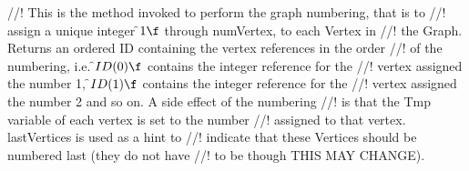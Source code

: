 //! This is the method invoked to perform the graph numbering, that is to
//! assign a unique integer \f$1\f$ through \p numVertex, to each Vertex in
//! the Graph. Returns an ordered ID containing the vertex references in the order
//! of the numbering, i.e. \f$ID(0)\f$ contains the integer reference for the
//! vertex assigned the number 1, \f$ID(1)\f$ contains the integer reference for the
//! vertex assigned the number 2 and so on. A side effect of the numbering
//! is that the \p Tmp variable of each vertex is set to the number
//! assigned to that vertex. \p lastVertices is used as a hint to
//! indicate that these Vertices should be numbered last (they do not have
//! to be though THIS MAY CHANGE).






